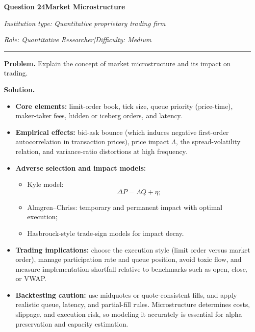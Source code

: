 \documentclass[11pt,letterpaper,openany]{book}
\newcommand{\InterviewQuestionHeader}[5]{%
  \vspace{1.0em}%
  {\large\bfseries #1\enspace #4\par}%
  {\small\itshape Institution type: #2\par}%
  {\small\itshape Role: #3\enspace |\enspace Difficulty: #5\par}%
  \vspace{0.25em}\hrule\vspace{0.45em}%
}
\begin{document}
\InterviewQuestionHeader{Question 24}{Quantitative proprietary trading firm}{Quantitative Researcher}{Market Microstructure}{Medium}
\textbf{Problem.} Explain the concept of market microstructure and its impact on trading.

\textbf{Solution.}

\begin{itemize}
\item \textbf{Core elements:} limit-order book, tick size, queue priority (price-time), maker-taker fees, hidden or iceberg orders, and latency.

\item \textbf{Empirical effects:} bid-ask bounce (which induces negative first-order autocorrelation in transaction prices), price impact \(\Lambda\), the spread-volatility relation, and variance-ratio distortions at high frequency.

\item \textbf{Adverse selection and impact models:}
\begin{itemize}
\item Kyle model:
\[
\Delta P = \Lambda Q + \eta;
\]
\item Almgren--Chriss: temporary and permanent impact with optimal execution;
\item Hasbrouck-style trade-sign models for impact decay.
\end{itemize}

\item \textbf{Trading implications:} choose the execution style (limit order versus market order), manage participation rate and queue position, avoid toxic flow, and measure implementation shortfall relative to benchmarks such as open, close, or VWAP.

\item \textbf{Backtesting caution:} use midquotes or quote-consistent fills, and apply realistic queue, latency, and partial-fill rules. Microstructure determines costs, slippage, and execution risk, so modeling it accurately is essential for alpha preservation and capacity estimation.
\end{itemize}
\end{document}
